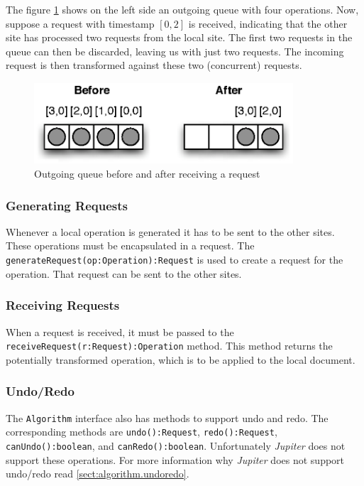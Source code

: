 The figure \ref{fig:algorithm.outqueue} shows on the left side an outgoing
queue with four operations. Now, suppose a request with timestamp $[0,2]$
is received, indicating that the other site has processed two requests
from the local site. The first two requests in the queue can then be
discarded, leaving us with just two requests. The incoming request is then
transformed against these two (concurrent) requests.

\begin{figure}[H]
\centering
\includegraphics[height=3.03cm,width=9.67cm]{../images/finalreport/algorithm_outqueue.eps}
\caption{Outgoing queue before and after receiving a request}
\label{fig:algorithm.outqueue}
\end{figure}

\subsubsection{Generating Requests}
Whenever a local operation is generated it has to be sent to the other sites.
These operations must be encapsulated in a request. The
\texttt{generateRequest(op:Operation):Request} is used to create a request
for the operation. That request can be sent to the other sites.

\subsubsection{Receiving Requests}
When a request is received, it must be passed to the
\texttt{receiveRequest(r:Request):Operation} method. This method returns
the potentially transformed operation, which is to be applied to the
local document.

\subsubsection{Undo/Redo}
The \texttt{Algorithm} interface also has methods to support undo and redo.
The corresponding methods are \texttt{undo():Request}, \texttt{redo():Request},
\texttt{canUndo():boolean}, and \texttt{canRedo():boolean}. Unfortunately
\emph{Jupiter} does not support these operations. For more information why
\emph{Jupiter} does not support undo/redo read \ref{sect:algorithm.undoredo}.

